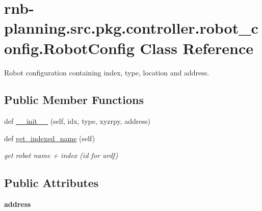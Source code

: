 \hypertarget{classrnb-planning_1_1src_1_1pkg_1_1controller_1_1robot__config_1_1_robot_config}{}\section{rnb-\/planning.src.\+pkg.\+controller.\+robot\+\_\+config.\+Robot\+Config Class Reference}
\label{classrnb-planning_1_1src_1_1pkg_1_1controller_1_1robot__config_1_1_robot_config}


Robot configuration containing index, type, location and address.  


\subsection*{Public Member Functions}
\begin{DoxyCompactItemize}
\item 
def \hyperlink{classrnb-planning_1_1src_1_1pkg_1_1controller_1_1robot__config_1_1_robot_config_af22e5cd5109357903d00895774903e66}{\+\_\+\+\_\+init\+\_\+\+\_\+} (self, idx, type, xyzrpy, address)
\item 
\mbox{\label{classrnb-planning_1_1src_1_1pkg_1_1controller_1_1robot__config_1_1_robot_config_ad9d6947735508524418e53acf25c3c0a}} 
def \hyperlink{classrnb-planning_1_1src_1_1pkg_1_1controller_1_1robot__config_1_1_robot_config_ad9d6947735508524418e53acf25c3c0a}{get\+\_\+indexed\+\_\+name} (self)
\begin{DoxyCompactList}\small\item\em get robot name + index (id for urdf) \end{DoxyCompactList}\end{DoxyCompactItemize}
\subsection*{Public Attributes}
\begin{DoxyCompactItemize}
\item 
\mbox{\label{classrnb-planning_1_1src_1_1pkg_1_1controller_1_1robot__config_1_1_robot_config_ad8e05dccfc1113dbd50327d0b148bdf7}} 
{\bfseries address}
\end{DoxyCompactItemize}


